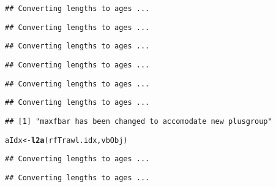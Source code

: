 \documentclass[a4paper,english,10pt]{article}\usepackage[]{graphicx}\usepackage[]{color}
\makeatletter
\newcommand{\hlstd}[1]{\textcolor[rgb]{0.345,0.345,0.345}{#1}}%
\newcommand{\hlkwb}[1]{\textcolor[rgb]{0.69,0.353,0.396}{#1}}%
\newcommand{\hlkwd}[1]{\textcolor[rgb]{0.737,0.353,0.396}{\textbf{#1}}}%
\newenvironment{kframe}{%
 \def\at@end@of@kframe{}%
 \ifinner\ifhmode%
  \def\at@end@of@kframe{\end{minipage}}%
  \begin{minipage}{\columnwidth}%
 \fi\fi%
 \def\FrameCommand##1{\hskip\@totalleftmargin \hskip-\fboxsep
 \colorbox{shadecolor}{##1}\hskip-\fboxsep
     \hskip-\linewidth \hskip-\@totalleftmargin \hskip\columnwidth}%
 \MakeFramed {\advance\hsize-\width
   \@totalleftmargin\z@ \linewidth\hsize
   \@setminipage}}%
 {\par\unskip\endMakeFramed%
 \at@end@of@kframe}
\newenvironment{knitrout}{}{} %
\makeatother
\begin{document}
\begin{knitrout}
\begin{kframe}
{\ttfamily\noindent\color{warningcolor}{\#\# Warning: NaNs produced}}\begin{verbatim}
## Converting lengths to ages ...
\end{verbatim}


{\ttfamily\noindent\color{warningcolor}{\#\# Warning: NaNs produced}}\begin{verbatim}
## Converting lengths to ages ...
\end{verbatim}


{\ttfamily\noindent\color{warningcolor}{\#\# Warning: NaNs produced}}\begin{verbatim}
## Converting lengths to ages ...
\end{verbatim}


{\ttfamily\noindent\color{warningcolor}{\#\# Warning: NaNs produced}}\begin{verbatim}
## Converting lengths to ages ...
\end{verbatim}


{\ttfamily\noindent\color{warningcolor}{\#\# Warning: NaNs produced}}\begin{verbatim}
## Converting lengths to ages ...
\end{verbatim}


{\ttfamily\noindent\color{warningcolor}{\#\# Warning: NaNs produced}}\begin{verbatim}
## Converting lengths to ages ...
\end{verbatim}


{\ttfamily\noindent\color{warningcolor}{\#\# Warning: NaNs produced}}\begin{verbatim}
## [1] "maxfbar has been changed to accomodate new plusgroup"
\end{verbatim}
\begin{alltt}
\hlstd{aIdx} \hlkwb{<-} \hlkwd{l2a}\hlstd{(rfTrawl.idx, vbObj)}
\end{alltt}


{\ttfamily\noindent\color{warningcolor}{\#\# Warning: Catch in numbers will be summed accross lenghths, everything else will be averaged. If this is not what you want, you'll have to deal with these slots by hand.}}\begin{verbatim}
## Converting lengths to ages ...
\end{verbatim}


{\ttfamily\noindent\color{warningcolor}{\#\# Warning: NaNs produced}}\begin{verbatim}
## Converting lengths to ages ...
\end{verbatim}



\end{kframe}
\end{knitrout}
\end{document}
